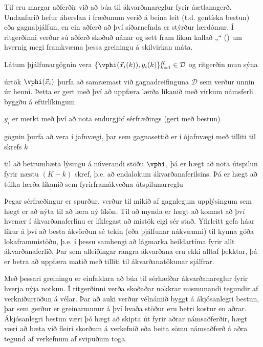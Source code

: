 Til eru margar aðferðir við að búa til ákvarðanareglur fyrir áætlanagerð. 
Undanfarið hefur áherslan í fræðunum verið á beina leit (t.d. gentíska bestun) 
eða gagnaþjálfun, en ein aðferð að því síðarnefnda er stýrður lærdómur.
Í ritgerðinni verður sú aðferð skoðuð nánar og sett fram líkan kallað 
„\fullnameAlice“ (\Alice) um hvernig megi 
framkvæma þessa greiningu á skilvirkan máta. 

Látum þjálfunargögnin vera 
\mbox{$\{\vphi(\vec{x}_i(k)),y_i(k)\}_{k=1}^K\in\mathcal{D}$} og ritgerðin mun 
sýna
\begin{enumerate*}[itemjoin*={{ og }}]
    \item úrtök $\vphi(\vec{x}_i)$ þurfa að samræmast við gagnadreifinguna 
    $\mathcal{D}$ sem verður unnin úr henni. Þetta er gert með því að uppfæra 
    lærða líkanið með virkum námsferli byggðu á eftirlíkingum
    \item $y_i$ er merkt með því að nota endurgjöf sérfræðings (gert með bestun)
    \item gögnin þurfa að vera í jafnvægi, þar sem gagnasettið er í ójafnvægi 
    með tilliti til skrefs $k$
    \item til að betrumbæta lýsingu á núverandi stöðu $\vphi$, þá er hægt að 
    nota útspilun fyrir næstu 
    $(K-k)$ skref, þ.e. að endalokum ákvarðanaferilsins. Þá er hægt að túlka 
    lærða líkanið sem fyrirframákveðna útspilunarreglu
\end{enumerate*}

Þegar sérfræðingur er spurður, verður til mikið af gagnlegum upplýsingum sem 
hægt er að nýta til að læra ný líkön. Til að mynda er hægt að komast að því 
hvenær í ákvarðanaferlinu er líklegast að mistök eigi sér stað. Yfirleitt gefa 
háar líkur á því að besta ákvörðun sé tekin (eða þjálfunar nákvæmni) til kynna 
góða lokaframmistöðu, þ.e. í þessu samhengi að lágmarka heildartíma fyrir allt 
ákvarðanaferlið. Þar sem afleiðingar rangra ákvarðana eru ekki alltaf þekktar, 
þá er betra að uppfæra matið með tilliti til ákvarðanatökunar sjálfrar.

Með þessari greiningu er einfaldara að búa til sérhæfðar ákvarðanareglur fyrir 
hverja nýja notkun. Í ritgerðinni verða skoðaðar nokkrar mismunandi tegundir af 
verkniðurröðun á vélar. 
Þar að auki verður vélnámið byggt á ákjósanlegri bestun, þar sem gerður er 
greinarmunur á því hvaða stöður eru betri kostur en aðrar. Ákjósanlegri bestun 
væri þó hægt að skipta út fyrir aðrar námsaðferðir, hægt væri að bæta við 
fleiri skorðum á verkefnið eða beita sömu námsaðferð á aðra tegund af verkefnum 
af svipuðum toga. 

